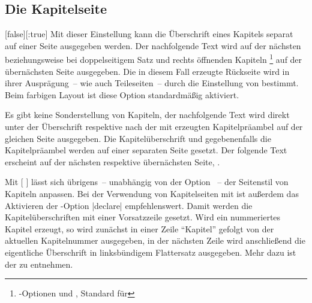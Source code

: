 \begin{Declaration*}{}
\begin{Declaration*}{}
\begin{Declaration*}{}
\subsection{Die Kapitelseite}
\begin{Declaration}{}%
  [false][:true]%
\printdeclarationlist%
%
%
%
%
%
%
Mit dieser Einstellung kann die Überschrift eines Kapitels separat auf einer 
Seite ausgegeben werden. Der nachfolgende Text wird auf der nächsten 
beziehungsweise bei doppelseitigem Satz und rechts öffnenden Kapiteln%
\footnote{%
  \KOMAScript-Optionen  und , Standard 
  für 
}
auf der übernächsten Seite ausgegeben. Die in diesem Fall erzeugte Rückseite 
wird in ihrer Ausprägung~-- wie auch Teileseiten~-- durch die Einstellung von 
 bestimmt. Beim farbigen Layout ist diese Option 
standardmäßig aktiviert. \notudscrartcl
%
\begin{values}{}
\itemfalse
  Es gibt keine Sonderstellung von Kapiteln, der nachfolgende Text wird direkt 
  unter der Überschrift respektive nach der mit  
  erzeugten Kapitelpräambel auf der gleichen Seite ausgegeben.
\itemtrue*
  Die Kapitelüberschrift und gegebenenfalls die Kapitelpräambel werden auf 
  einer separaten Seite gesetzt. Der folgende Text erscheint auf der nächsten 
  respektive übernächsten Seite, .
\end{values}
%
Mit [%
]
lässt sich übrigens~-- unabhängig von der Option ~-- der 
Seitenstil von Kapiteln anpassen. Bei der Verwendung von Kapitelseiten mit 
 ist außerdem das Aktivieren der \KOMAScript-Option 
|declare| empfehlenswert. Damit werden die 
Kapitelüberschriften mit einer Vorsatzzeile gesetzt. Wird ein nummeriertes 
Kapitel erzeugt, so wird zunächst in einer Zeile \enquote{Kapitel} gefolgt von 
der aktuellen Kapitelnummer ausgegeben, in der nächsten Zeile wird anschließend 
die eigentliche Überschrift in linksbündigem Flattersatz ausgegeben. Mehr dazu 
ist der  zu entnehmen.
\end{Declaration}



\end{Declaration*}
\end{Declaration*}
\end{Declaration*}
